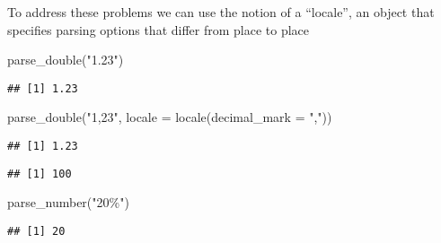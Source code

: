 \documentclass[
]{article}
\newenvironment{Shaded}{\begin{snugshade}}{\end{snugshade}}
\newcommand{\AttributeTok}[1]{\textcolor[rgb]{0.77,0.63,0.00}{#1}}
\newcommand{\FunctionTok}[1]{\textcolor[rgb]{0.00,0.00,0.00}{#1}}
\newcommand{\NormalTok}[1]{#1}
\newcommand{\StringTok}[1]{\textcolor[rgb]{0.31,0.60,0.02}{#1}}
\begin{document}
To address these problems we can use the notion of a ``locale'', an
object that specifies parsing options that differ from place to place

\begin{Shaded}
\begin{Highlighting}[]
\FunctionTok{parse\_double}\NormalTok{(}\StringTok{"1.23"}\NormalTok{)}
\end{Highlighting}
\end{Shaded}

\begin{verbatim}
## [1] 1.23
\end{verbatim}

\begin{Shaded}
\begin{Highlighting}[]
\FunctionTok{parse\_double}\NormalTok{(}\StringTok{"1,23"}\NormalTok{, }\AttributeTok{locale =} \FunctionTok{locale}\NormalTok{(}\AttributeTok{decimal\_mark =} \StringTok{","}\NormalTok{))}
\end{Highlighting}
\end{Shaded}

\begin{verbatim}
## [1] 1.23
\end{verbatim}

\begin{Shaded}
\end{Shaded}

\begin{verbatim}
## [1] 100
\end{verbatim}

\begin{Shaded}
\begin{Highlighting}[]
\FunctionTok{parse\_number}\NormalTok{(}\StringTok{"20\%"}\NormalTok{)}
\end{Highlighting}
\end{Shaded}

\begin{verbatim}
## [1] 20
\end{verbatim}

\begin{Shaded}
\end{Shaded}
\end{document}
